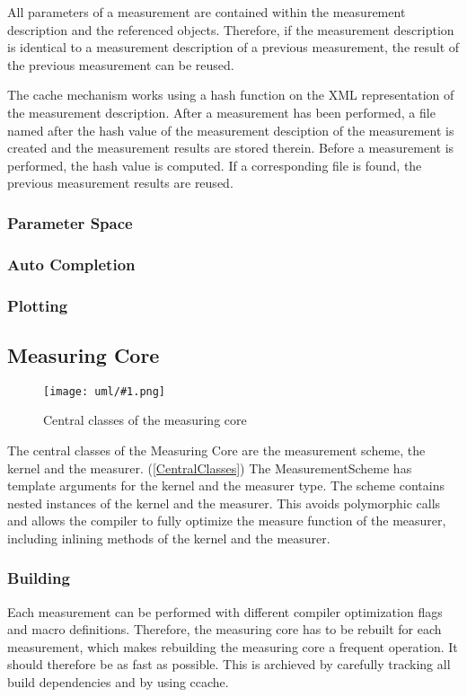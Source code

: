 \documentclass[a4paper,12pt]{article}
\newcommand{\umlDiagram}[1]{\begin{center}\texttt{[image: uml/\#1.png]}\end{center}}
\newcommand{\umlFloat}[2]{
\begin{figure}[tbh]
\umlDiagram{#1}
\caption{#2}
\label{#1}
\end{figure}
}
\newcommand{\umlRef}[1]{\autoref{#1}}
\begin{document}
All parameters of a measurement are contained within the measurement description and the referenced objects. Therefore, if the measurement description is identical to a measurement description of a previous measurement, the result of the previous measurement can be reused. 

The cache mechanism works using a hash function on the XML representation of the measurement description. After a measurement has been performed, a file named after the hash value of the measurement desciption of the measurement is created and the measurement results are stored therein. Before a measurement is performed, the hash value is computed. If a corresponding file is found, the previous measurement results are reused.

\subsubsection{Parameter Space}

\subsubsection{Auto Completion}

\subsubsection{Plotting}

\subsection{Measuring Core}
\umlFloat{CentralClasses}{Central classes of the measuring core}
The central classes of the Measuring Core are the measurement scheme, the kernel and the measurer. (\umlRef{CentralClasses}) The MeasurementScheme has template arguments for the kernel and the measurer type. The scheme contains nested instances of the kernel and the measurer. This avoids polymorphic calls and allows the compiler to fully optimize the measure function of the measurer, including inlining methods of the kernel and the measurer.

\subsubsection{Building}
Each measurement can be performed with different compiler optimization flags and macro definitions. Therefore, the measuring core has to be rebuilt for each measurement, which makes rebuilding the measuring core a frequent operation. It should therefore be as fast as possible. This is archieved by carefully tracking all build dependencies and by using ccache. 
\end{document}
